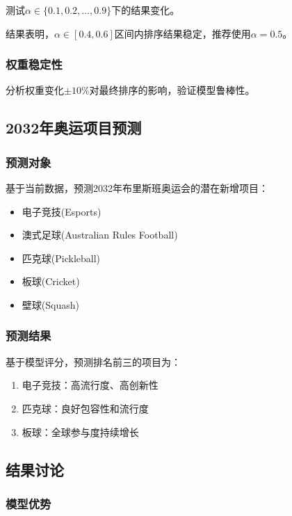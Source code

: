 测试$\alpha \in \{0.1, 0.2, \ldots, 0.9\}$下的结果变化。

结果表明，$\alpha \in [0.4, 0.6]$区间内排序结果稳定，推荐使用$\alpha = 0.5$。

\subsubsection{权重稳定性}

分析权重变化$\pm 10\%$对最终排序的影响，验证模型鲁棒性。

\subsection{2032年奥运项目预测}

\subsubsection{预测对象}

基于当前数据，预测2032年布里斯班奥运会的潜在新增项目：
\begin{itemize}
\item 电子竞技(Esports)
\item 澳式足球(Australian Rules Football)
\item 匹克球(Pickleball)
\item 板球(Cricket)
\item 壁球(Squash)
\end{itemize}

\subsubsection{预测结果}

基于模型评分，预测排名前三的项目为：
\begin{enumerate}
\item 电子竞技：高流行度、高创新性
\item 匹克球：良好包容性和流行度
\item 板球：全球参与度持续增长
\end{enumerate}

\subsection{结果讨论}

\subsubsection{模型优势}

